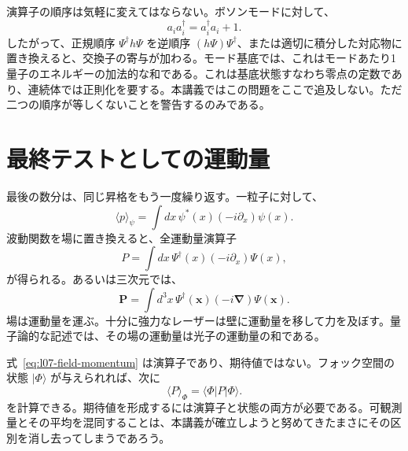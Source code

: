 演算子の順序は気軽に変えてはならない。ボソンモードに対して、
\begin{equation}
a_i a_i^\dagger=a_i^\dagger a_i+1.
\end{equation}
したがって、正規順序 \(\Psi^\dagger h\Psi\) を逆順序 \((h\Psi)\Psi^\dagger\)、または適切に積分した対応物に置き換えると、交換子の寄与が加わる。モード基底では、これはモードあたり1量子のエネルギーの加法的な和である。これは基底状態すなわち零点の定数であり、連続体では正則化を要する。本講義ではこの問題をここで追及しない。ただ二つの順序が等しくないことを警告するのみである。

\begin{classroomqa}
\end{classroomqa}

\section{最終テストとしての運動量}

最後の数分は、同じ昇格をもう一度繰り返す。一粒子に対して、
\begin{equation}
\langle p\rangle_\psi
=\int dx\,\psi^*(x)\left(-i\partial_x\right)\psi(x).
\label{eq:l07-one-particle-momentum}
\end{equation}
波動関数を場に置き換えると、全運動量演算子
\begin{equation}
P=\int dx\,\Psi^\dagger(x)\left(-i\partial_x\right)\Psi(x),
\label{eq:l07-field-momentum}
\end{equation}
が得られる。あるいは三次元では、
\begin{equation}
\mathbf P=\int d^3x\,\Psi^\dagger(\mathbf x)
\left(-i\boldsymbol\nabla\right)\Psi(\mathbf x).
\end{equation}
場は運動量を運ぶ。十分に強力なレーザーは壁に運動量を移して力を及ぼす。量子論的な記述では、その場の運動量は光子の運動量の和である。

式~\eqref{eq:l07-field-momentum} は演算子であり、期待値ではない。フォック空間の状態 \(|\Phi\rangle\) が与えられれば、次に
\begin{equation}
\langle P\rangle_\Phi=\langle\Phi|P|\Phi\rangle.
\end{equation}
を計算できる。期待値を形成するには演算子と状態の両方が必要である。可観測量とその平均を混同することは、本講義が確立しようと努めてきたまさにその区別を消し去ってしまうであろう。

